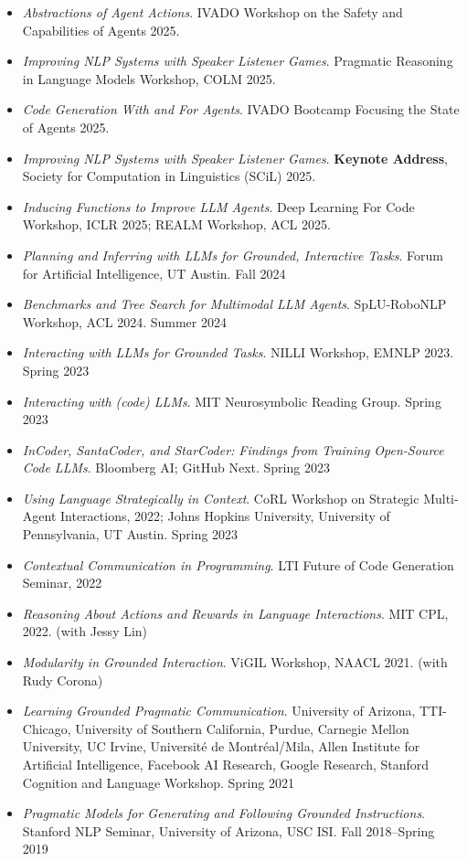 \begin{itemize}[leftmargin=-0.4mm,partopsep=0pt,label=]
\item \emph{Abstractions of Agent Actions}. IVADO Workshop on the Safety and Capabilities of Agents 2025.
\item \emph{Improving NLP Systems with Speaker Listener Games}.  Pragmatic Reasoning in Language Models Workshop, COLM 2025.
\item \emph{Code Generation With and For Agents}. IVADO Bootcamp Focusing the State of Agents 2025.
\item \emph{Improving NLP Systems with Speaker Listener Games}. \textbf{Keynote Address}, Society for Computation in Linguistics (SCiL) 2025.
\item \emph{Inducing Functions to Improve LLM Agents}. Deep Learning For Code Workshop, ICLR 2025; REALM Workshop, ACL 2025.
\item \emph{Planning and Inferring with LLMs for Grounded, Interactive Tasks}. Forum for Artificial Intelligence, UT Austin. Fall 2024
\item \emph{Benchmarks and Tree Search for Multimodal LLM Agents}. SpLU-RoboNLP Workshop, ACL 2024. Summer 2024
\item \emph{Interacting with LLMs for Grounded Tasks}. NILLI Workshop, EMNLP 2023. Spring 2023
\item \emph{Interacting with (code) LLMs}. MIT Neurosymbolic Reading Group. Spring 2023
\item \emph{InCoder, SantaCoder, and StarCoder: Findings from Training Open-Source Code LLMs}. Bloomberg AI; GitHub Next. Spring 2023
\item \emph{Using Language Strategically in Context}. CoRL Workshop on Strategic Multi-Agent Interactions, 2022; Johns Hopkins University, University of Pennsylvania, UT Austin. Spring 2023
\item \emph{Contextual Communication in Programming}. LTI Future of Code Generation Seminar, 2022
\item \emph{Reasoning About Actions and Rewards in Language Interactions}. MIT CPL, 2022. (with Jessy Lin)
\item \emph{Modularity in Grounded Interaction}. ViGIL Workshop, NAACL 2021. (with Rudy Corona)
\item \emph{Learning Grounded Pragmatic Communication}. University of Arizona, TTI-Chicago, University of Southern California, Purdue, Carnegie Mellon University, UC Irvine, Université de Montréal/Mila, Allen Institute for Artificial Intelligence, Facebook AI Research, Google Research, Stanford Cognition and Language Workshop. Spring 2021
\item \emph{Pragmatic Models for Generating and Following Grounded Instructions}. Stanford NLP Seminar, University of Arizona, USC ISI. Fall 2018--Spring 2019
\end{itemize}

